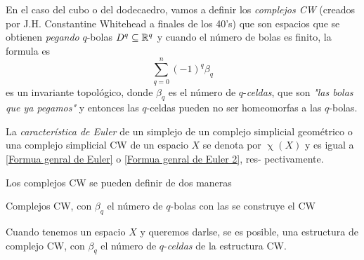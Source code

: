 En el caso del cubo o del dodecaedro, vamos a definir los \textit{complejos CW} (creados por J.H. Constantine Whitehead a finales de los 40's) que son espacios que se obtienen \textit{pegando} $q$-bolas $D^q\subseteq \mathbb{R}^q$ y cuando el número de bolas es finito, la formula es 
\begin{equation}
\label{Formua genral de Euler 2}
    \sum_{q=0}^n(-1)^q\beta_q
\end{equation}
es un invariante topológico, donde $\beta_q$ es el número de $q$-\textit{celdas}, que son \textit{"las bolas que ya pegamos"} y entonces las $q$-celdas pueden no ser homeomorfas a las $q$-bolas.
\begin{definicion}
    La \textit{característica de Euler} de un simplejo de un complejo simplicial geométrico o una complejo simplicial CW de un espacio $X$ se denota por $\upchi(X)$ y es igual a \ref{Formua genral de Euler} o \ref{Formua genral de Euler 2}, res- pectivamente.
    \begin{nota}
        Los complejos CW se pueden definir de dos maneras
        \item Complejos CW, con $\beta_q$ el número de $q$-bolas con las se construye el CW
        \item  Cuando tenemos un espacio $X$ y queremos darlse, se es posible, una estructura de complejo CW, con $\beta_q$ el número de $q$-\textit{celdas} de la estructura CW.
    \end{nota}
\end{definicion}